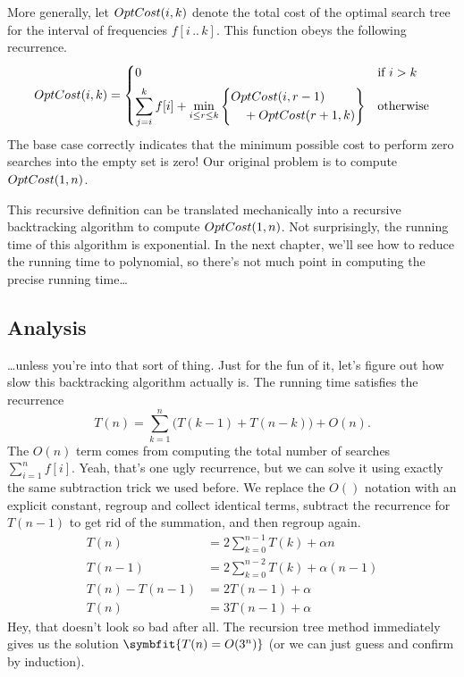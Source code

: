 More generally, let $OptCost(i, k)$ denote the total cost of the optimal search tree for the interval of frequencies $f[i\,..\,k]$.
This function obeys the following recurrence.
\[
OptCost(i, k) = \begin{cases}
0 & \text{if } i > k\\[1ex]
\displaystyle\sum_{j=i}^{k} f[i] + \min_{i \le r \le k} \left\{\begin{aligned} &OptCost(i, r-1)\\ &\quad + OptCost(r+1, k) \end{aligned}\right\} & \text{otherwise}
\end{cases}
\]
The base case correctly indicates that the minimum possible cost to perform zero searches into the empty set is zero!
Our original problem is to compute $OptCost(1, n)$.

This recursive definition can be translated mechanically into a recursive backtracking algorithm to compute $OptCost(1, n)$.
Not surprisingly, the running time of this algorithm is exponential.
In the next chapter, we’ll see how to reduce the running time to polynomial, so there’s not much point in computing the precise running time\dots

\subsection{Analysis}

\dots unless you’re into that sort of thing.
Just for the fun of it, let’s figure out how slow this backtracking algorithm actually is.
The running time satisfies the recurrence
\[
T(n) = \sum_{k=1}^{n} \bigl(T(k-1) + T(n-k)\bigr) + O(n).
\]
The $O(n)$ term comes from computing the total number of searches $\sum_{i=1}^{n} f[i]$.
Yeah, that’s one ugly recurrence, but we can solve it using exactly the same subtraction trick we used before.
We replace the $O()$ notation with an explicit constant, regroup and collect identical terms, subtract the recurrence for $T(n-1)$ to get rid of the summation, and then regroup again.
\begin{align*}
T(n) &= 2\sum_{k=0}^{n-1} T(k) + \alpha n\\
T(n-1) &= 2\sum_{k=0}^{n-2} T(k) + \alpha(n-1)\\
T(n) - T(n-1) &= 2T(n-1) + \alpha\\
T(n) &= 3T(n-1) + \alpha
\end{align*}
Hey, that doesn’t look so bad after all.
The recursion tree method immediately gives us the solution $\symbfit{T(n) = O(3^n)}$ (or we can just guess and confirm by induction).

